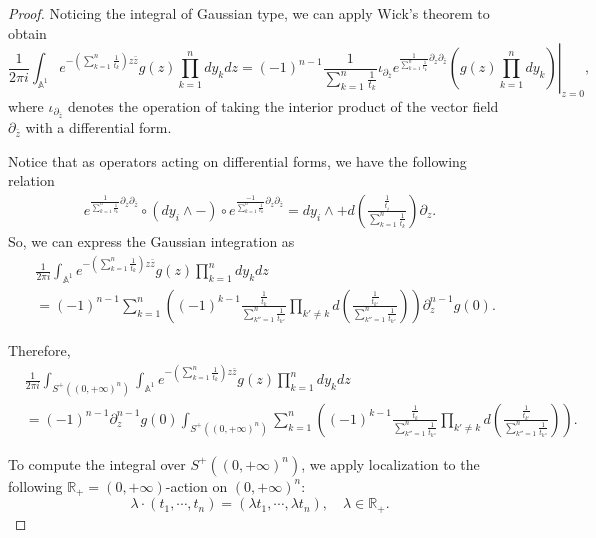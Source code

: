 \documentclass[11pt]{amsart}
\theoremstyle{definition}
\theoremstyle{remark}
\numberwithin{equation}{section}
\begin{document}
\begin{proof}
Noticing the integral of Gaussian type, we can apply Wick's theorem to obtain
\begin{equation}
    \frac{1}{2\pi i}\int_{\mathbb{A}^{1}}e^{-\left(\sum_{k=1}^{n}\frac{1}{t_{k}}\right)z\bar{z}}g(z)\prod_{k=1}^{n}dy_{k}dz
   =(-1)^{n-1}\left.\frac{1}{\sum_{k=1}^{n}\frac{1}{t_{k}}}\iota_{\partial_{\bar{z}}}e^{\frac{1}{\sum_{k=1}^{n}\frac{1}{t_{k}}}\partial_{z}\partial_{\bar{z}}}\left(g(z)\prod_{k=1}^{n}dy_{k}\right)\right|_{z=0},
\end{equation}
where $\iota_{\partial_{\bar{z}}}$ denotes the operation of taking the interior product of the vector field $\partial_{\bar{z}}$ with a differential form.

Notice that as operators acting on differential forms, we have the following relation
\begin{align*}
    e^{\frac{1}{\sum_{k=1}^{n}\frac{1}{t_{k}}}\partial_{z}\partial_{\bar{z}}}\circ \left(dy_{i} \wedge - \right) \circ e^{\frac{-1}{\sum_{k=1}^{n}\frac{1}{t_{k}}}\partial_{z}\partial_{\bar{z}}}=dy_{i} \wedge +d(\frac{\frac{1}{t_{i}}}{\sum_{k=1}^{n}\frac{1}{t_{k}}})\partial_{z}.
\end{align*}
So, we can express the Gaussian integration as
\begin{align*}
    &\frac{1}{2\pi i}\int_{\mathbb{A}^{1}}e^{-\left(\sum_{k=1}^{n}\frac{1}{t_{k}}\right)z\bar{z}}g(z)\prod_{k=1}^{n}dy_{k}dz\\
    &=
    (-1)^{n-1}\sum_{k=1}^{n}\left((-1)^{k-1}\frac{\frac{1}{t_{k}}}{\sum_{k''=1}^{n}\frac{1}{t_{k''}}}\prod_{k'\neq k}d(\frac{\frac{1}{t_{k'}}}{\sum_{k''=1}^{n}\frac{1}{t_{k''}}})\right)\partial_{z}^{n-1}g(0).
\end{align*}

Therefore,
\begin{align*}
     &\frac{1}{2\pi i}\int_{S^{+}((0,+\infty)^n)}\int_{\mathbb{A}^{1}}e^{-\left(\sum_{k=1}^{n}\frac{1}{t_{k}}\right)z\bar{z}}g(z)\prod_{k=1}^{n}dy_{k}dz\\
     &=
     (-1)^{n-1}\partial_{z}^{n-1}g(0)\int_{S^{+}((0,+\infty)^n)}\sum_{k=1}^{n}\left((-1)^{k-1}\frac{\frac{1}{t_{k}}}{\sum_{k''=1}^{n}\frac{1}{t_{k''}}}\prod_{k'\neq k}d(\frac{\frac{1}{t_{k'}}}{\sum_{k''=1}^{n}\frac{1}{t_{k''}}})\right).
\end{align*}

To compute the integral over $S^{+}((0,+\infty)^n)$, we apply localization to the following $\mathbb{R}_+ = (0,+\infty)$-action on $(0,+\infty)^n$:
$$
\lambda\cdot (t_{1},\cdots,t_{n})=(\lambda t_{1},\cdots,\lambda t_{n}),\quad \lambda\in \mathbb{R}_+.
$$


\end{proof}
\end{document}
